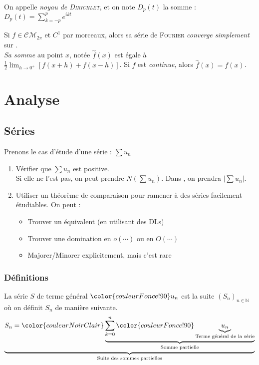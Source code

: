 \documentclass[11pt,a4paper,fleqn,pdftex]{report}
\begin{document}
\begin{dfn}
On appelle \emph{noyau de \textsc{Dirichlet}}, et on note $D_p(t)$ la somme : $D_p(t)=\sum_{k=-p}^p e^{ikt}$
\end{dfn}
\begin{itheorem}
Si $f \in \mathcal{CM}_{2\pi}$ et $C^1$ par morceaux, alors sa série de \textsc{Fourier} \emph{converge simplement} sur \Reel{}. \\
\emph{Sa somme} au point $x$, notée $\overset{\sim}{f}(x)$ est égale à $\frac{1}{2}\lim_{h\to 0^+}[f(x+h) + f(x-h)]$. Si $f$ est \emph{continue}, alors $\overset{\sim}{f}(x) = f(x)$.
\end{itheorem}
\part{Analyse}
\chapter{Séries} %
\label{cha:series}
\begin{methode}
Prenons le cas d'étude d'une série : $ \sum u_n$
\begin{enumerate}
    \item Vérifier que $\sum u_n$ est positive. \\ Si elle ne l'est pas, on peut prendre $N(\sum u_n)$. Dans \Reel{}, on prendra $\left| \sum u_n \right|$.
    \item Utiliser un théorème de comparaison pour ramener à des séries facilement étudiables. On peut : 
    \begin{itemize}
        \item Trouver un équivalent (en utilisant des \glspl{DL})
        \item Trouver une domination en $o(\cdots)$ ou en $O(\cdots)$
        \item Majorer/Minorer explicitement, mais c'est rare
    \end{itemize}
\end{enumerate}
\end{methode}
\section{Définitions}
\begin{dfn}
La série $S$ de terme général $\color{couleurFonce!90} u_n$ est la suite $\left( S_n \right)_{n\in\mathbb{N}}$ où on définit $S_n$ de manière suivante.
    \[
    \underbrace{S_n = \color{couleurNoirClair} \underbrace{\sum_{k=0}^{n} \color{couleurFonce!90}\underbrace{u_n}_{\text{Terme général de la série}}}_{\text{Somme partielle}}}_{\text{Suite des sommes partielles}}
    \]
\end{dfn}
\end{document}

